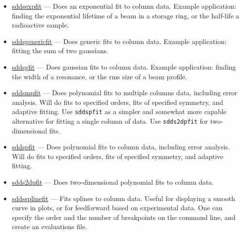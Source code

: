 \documentclass[11pt]{article}
\newcommand{\progref}[1]{\hyperref[#1]{#1}}
\begin{document}
\begin{itemize}

\item \progref{sddsexpfit} --- Does an exponential fit to column data.  Example
application: finding the exponential lifetime of a beam in a storage ring, or the half-life a radioactive
sample.

\item \progref{sddsgenericfit} --- Does generic fits to column data.  Example application:
fitting the sum of two gaussians.

\item \progref{sddsgfit} --- Does gaussian fits to column data.  Example application:
finding the width of a resonance, or the rms size of a beam profile.


\item \progref{sddsmpfit} --- Does polynomial fits to multiple columns
data, including error analysis.  Will do fits to specified orders,
fits of specified symmetry, and adaptive fitting.  Use {\tt sddspfit}
as a simpler and somewhat more capable alternative for fitting a
single column of data. Use {\tt sdds2dpfit} for two-dimensional fits.

\item \progref{sddspfit} --- Does polynomial fits to column data,
including error analysis.  Will do fits to specified orders, fits of
specified symmetry, and adaptive fitting.

\item \progref{sdds2dpfit} --- Does two-dimensional polynomial fits to column data.

\item \progref{sddssplinefit} --- Fits splines to column data. Useful for displaying a smooth curve in plots, or for feedforward based on experimental data. One can specify the order and the number of breakpoints on the command line, and create an evaluations file.

\end{itemize}
\end{document}
